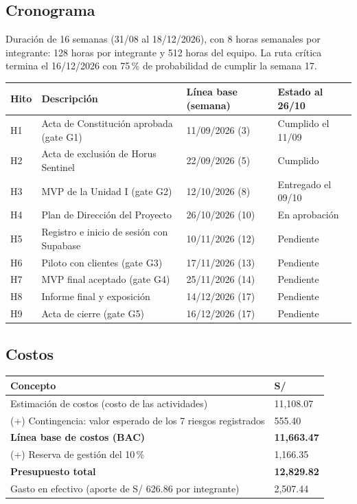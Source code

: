 \documentclass[11pt,a4paper]{article}
\begin{document}
\subsection{Cronograma}
Duración de 16 semanas (31/08 al 18/12/2026), con 8 horas semanales por integrante: 128 horas por integrante y 512 horas del equipo. La ruta crítica termina el 16/12/2026 con 75\,\% de probabilidad de cumplir la semana 17.

\vspace{0.1cm}
{\small
{}
\noindent\begin{tabularx}{\textwidth}{@{}C{0.8cm} L C{3.1cm} P{3.4cm}@{}}
\toprule
{}
\textbf{Hito} & \textbf{Descripción} & \textbf{Línea base (semana)} & \textbf{Estado al 26/10} \\
\midrule
H1 & Acta de Constitución aprobada (gate G1) & 11/09/2026 (3) & Cumplido el 11/09 \\
H2 & Acta de exclusión de Horus Sentinel & 22/09/2026 (5) & Cumplido \\
H3 & MVP de la Unidad I (gate G2) & 12/10/2026 (8) & Entregado el 09/10 \\
H4 & Plan de Dirección del Proyecto & 26/10/2026 (10) & En aprobación \\
H5 & Registro e inicio de sesión con Supabase & 10/11/2026 (12) & Pendiente \\
H6 & Piloto con clientes (gate G3) & 17/11/2026 (13) & Pendiente \\
H7 & MVP final aceptado (gate G4) & 25/11/2026 (14) & Pendiente \\
H8 & Informe final y exposición & 14/12/2026 (17) & Pendiente \\
H9 & Acta de cierre (gate G5) & 16/12/2026 (17) & Pendiente \\
\bottomrule
\end{tabularx}
}

\subsection{Costos}
{\small
{}
\noindent\begin{tabularx}{\textwidth}{@{}L Q{2.4cm}@{}}
\toprule
{}
\textbf{Concepto} & \textbf{S/} \\
\midrule
Estimación de costos (costo de las actividades) & 11,108.07 \\
(+) Contingencia: valor esperado de los 7 riesgos registrados & 555.40 \\
\textbf{Línea base de costos (BAC)} & \textbf{11,663.47} \\
(+) Reserva de gestión del 10\,\% & 1,166.35 \\
\textbf{Presupuesto total} & \textbf{12,829.82} \\
Gasto en efectivo (aporte de S/ 626.86 por integrante) & 2,507.44 \\
\bottomrule
\end{tabularx}
}
\end{document}
